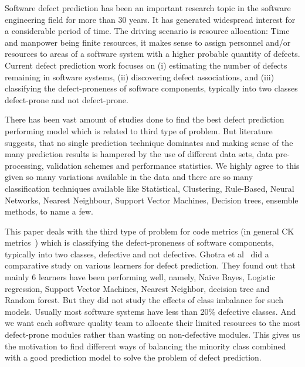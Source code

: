 \documentclass[conference]{IEEEtran}
\begin{document}
Software defect prediction has been an important research topic in the software engineering field for more than 30 years. It has generated widespread interest for a
considerable period of time. The driving scenario is resource
allocation: Time and manpower being finite resources, it
makes sense to assign personnel and/or resources to areas of
a software system with a higher probable quantity of defects. Current defect prediction work focuses on (i) estimating the number of defects remaining in software systems, (ii) discovering defect associations, and (iii) classifying the defect-proneness of software components, typically into two classes defect-prone and not defect-prone. 

There has been vast amount of studies done to find the best defect prediction performing model which is related to third type of problem. But literature suggests, that no single prediction technique dominates and making sense of the many prediction results is hampered by the use of different data sets, data pre-processing, validation schemes and performance
statistics. We highly agree to this given so many variations available in the data and there are so many classification techniques available like Statistical, Clustering, Rule-Based, Neural Networks, Nearest Neighbour, Support Vector Machines, Decision trees, ensemble methods, to name a few.


This paper deals with the third type of problem for code metrics (in general CK metrics~\cite{chidamber1994metrics}) which is classifying the defect-proneness of software components, typically into two classes, defective and not defective. Ghotra et al~\cite{ghotra2015revisiting} did a comparative study on various learners for defect prediction. They found out that mainly 6 learners have been performing well, namely, Naive Bayes, Logistic regression, Support Vector Machines, Nearest Neighbor, decision tree and Random forest. But they did not study the effects of class imbalance for such models. Usually most software systems have less than 20\% defective classes. And we want each software quality team to allocate their limited resources to the most defect-prone modules rather than wasting on non-defective modules. This gives us the motivation to find different ways of balancing the minority class combined with a good prediction model to solve the problem of defect prediction.
\end{document}

